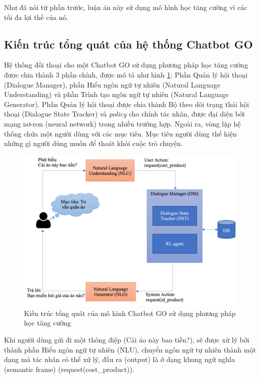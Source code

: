 Như đã nói từ phần trước, luận án này sử dụng mô hình học tăng cường vì các tối đa lợi thế của nó.

\subsection{Kiến trúc tổng quát của hệ thống Chatbot GO}
Hệ thống đối thoại cho một Chatbot GO sử dụng phương pháp học tăng cường được chia thành 3 phần chính, được mô tả như hình \ref{fig:chatbot}: Phần Quản lý hội thoại (Dialogue Manager), phần Hiểu ngôn ngữ tự nhiên (Natural Language Understanding) và phần Trình tạo ngôn ngữ tự nhiên (Natural Language Generator). Phần Quản lý hội thoại được chia thành Bộ theo dõi trạng thái hội thoại (Dialogue State Tracker) và \textit{policy} cho chính tác nhân, được đại diện bởi mạng nơ-ron (neural network) trong nhiều trường hợp. Ngoài ra, vòng lặp hệ thống chứa một người dùng với các mục tiêu. Mục tiêu người dùng thể hiện những gì người dùng muốn để thoát khỏi cuộc trò chuyện.

\begin{center}
    \begin{figure}[h!]
        \begin{center}
         \includegraphics[scale=0.8]{chapter3/img/overviewchatbot.png}
        \end{center}
        \caption{Kiến trúc tổng quát của mô hình Chatbot GO sử dụng phương pháp học tăng cường}
        \label{fig:chatbot}
    \end{figure}
\end{center}

Khi người dùng gửi đi một thông điệp (Cái áo này bao tiền?), sẽ được xử lý bởi thành phần Hiểu ngôn ngữ tự nhiên (NLU), chuyển ngôn ngữ tự nhiên thành một dạng mà tác nhân có thể xử lý, đầu ra (output) là ở dạng khung ngữ nghĩa (semantic frame) (request(cost\_product)).

